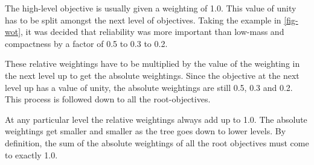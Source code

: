 The high-level objective is usually given a weighting of 1.0. This value of unity has to be split amongst the next level of objectives. Taking the example in \cref{fig-wot}, it was decided that reliability was more important than low-mass and compactness by a factor of 0.5 to 0.3 to 0.2.

These relative weightings have to be multiplied by the value of the weighting in the next level up to get the absolute weightings. Since the objective at the next level up has a value of unity, the absolute weightings are still 0.5, 0.3 and 0.2. This process is followed down to all the root-objectives. 

At any particular level the relative weightings always add up to 1.0. The absolute weightings get smaller and smaller as the tree goes down to lower levels. By definition, the sum of the absolute weightings of all the root objectives must come to exactly 1.0.



